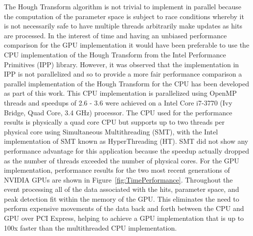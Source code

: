 \documentclass{JINST}
\begin{document}
The Hough Transform algorithm is not trivial to implement in parallel because the computation of the parameter space is subject to race
conditions whereby it is not necessarily safe to have multiple threads arbitrarily make updates as hits are processed.  In the interest of time
and having an unbiased performance comparison for the GPU implementation it would have been preferable to use the CPU implementation of the Hough Transform 
from the Intel Performance Primitives (IPP) library.  However, it was observed that the implementation in IPP is not parallelized and so to provide a more 
fair performance comparison a parallel implementation of the Hough Transform for the CPU has been developed as part of this work.  This CPU implementation is
 parallelized using OpenMP threads and speedups of 2.6 - 3.6 were achieved on a Intel Core i7-3770 (Ivy Bridge, Quad Core, 3.4 GHz) processor.  The CPU used 
for the performance results is physically a quad core CPU but supports up to two threads per physical core using Simultaneous Multithreading (SMT), 
with the Intel implementation of SMT known as HyperThreading (HT).  SMT did not show any performance advantage for this application because the speedup
 actually dropped as the number of threads exceeded the number of physical cores.  For the GPU implementation, performance results for the two most recent 
generations of NVIDIA GPUs are shown in Figure~\ref{fig:TimePerformance}.  Throughout the event processing all of the data associated
with the hits, parameter space, and peak detection fit within the memory of the GPU.  This eliminates the need to perform
expensive movements of the data back and forth between the CPU and GPU over PCI Express, helping to achieve a GPU implementation that is up to 100x faster than the multithreaded CPU implementation.
\end{document}
